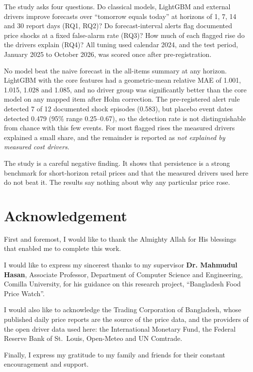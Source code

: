\documentclass[12pt]{report}
\newcommand{\unexpl}{\emph{not explained by measured cost drivers}}
\begin{document}
The study asks four questions. Do classical models, LightGBM and external drivers improve forecasts over ``tomorrow equals today'' at horizons of 1, 7, 14 and 30 report days (RQ1, RQ2)? Do forecast-interval alerts flag documented price shocks at a fixed false-alarm rate (RQ3)? How much of each flagged rise do the drivers explain (RQ4)? All tuning used calendar 2024, and the test period, January 2025 to October 2026, was scored once after pre-registration.

No model beat the naive forecast in the all-items summary at any horizon. LightGBM with the core features had a geometric-mean relative MAE of 1.001, 1.015, 1.028 and 1.085, and no driver group was significantly better than the core model on any mapped item after Holm correction. The pre-registered alert rule detected 7 of 12 documented shock episodes (0.583), but placebo event dates detected 0.479 (95\% range 0.25--0.67), so the detection rate is not distinguishable from chance with this few events. For most flagged rises the measured drivers explained a small share, and the remainder is reported as \unexpl.

The study is a careful negative finding. It shows that persistence is a strong benchmark for short-horizon retail prices and that the measured drivers used here do not beat it. The results say nothing about why any particular price rose.

\chapter*{Acknowledgement}
First and foremost, I would like to thank the Almighty Allah for His blessings that enabled me to complete this work.

\noindent I would like to express my sincerest thanks to my supervisor \textbf{Dr. Mahmudul Hasan}, Associate Professor, Department of Computer Science and Engineering, Comilla University, for his guidance on this research project, ``Bangladesh Food Price Watch''.

\noindent I would also like to acknowledge the Trading Corporation of Bangladesh, whose published daily price reports are the source of the price data, and the providers of the open driver data used here: the International Monetary Fund, the Federal Reserve Bank of St.\ Louis, Open-Meteo and UN Comtrade.

\noindent Finally, I express my gratitude to my family and friends for their constant encouragement and support.
\end{document}
